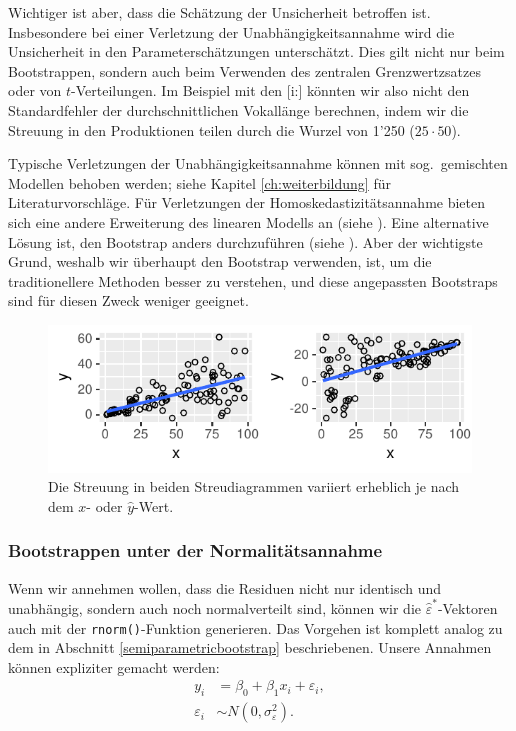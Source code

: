 \documentclass[oneside, 10pt]{book}\usepackage[]{graphicx}\usepackage[]{xcolor}
\newenvironment{knitrout}{}{} %
\begin{document}
 Wichtiger ist aber, dass die Schätzung der Unsicherheit betroffen ist.
 Insbesondere bei einer Verletzung der Unabhängigkeitsannahme wird die Unsicherheit
 in den Parameterschätzungen unterschätzt. Dies gilt nicht nur beim Bootstrappen,
 sondern auch beim Verwenden des zentralen Grenzwertzsatzes oder von $t$-Verteilungen.
 Im Beispiel mit den [i:] könnten wir also nicht den Standardfehler
 der durchschnittlichen Vokallänge berechnen, indem wir die Streuung in den
 Produktionen teilen durch die Wurzel von 1'250 ($25 \cdot 50$).

 Typische Verletzungen der Unabhängigkeitsannahme können
 mit sog.\ gemischten Modellen behoben werden; siehe
 Kapitel \ref{ch:weiterbildung} für Literaturvorschläge.
 Für Verletzungen der Homoskedastizitätsannahme bieten sich
 eine andere Erweiterung des linearen Modells an (siehe \citealp{Zuur2009}).
 Eine alternative Lösung ist, den Bootstrap anders durchzuführen
 (siehe \citealp[][Abschnitt 9.5]{Efron1993}).
 Aber der wichtigste Grund, weshalb wir überhaupt den Bootstrap verwenden,
 ist, um die traditionellere Methoden besser zu verstehen, und diese
 angepassten Bootstraps sind für diesen Zweck weniger geeignet.

\begin{knitrout}
\color{fgcolor}\begin{figure}[tp]

{\centering \includegraphics[width=.7\textwidth]{figs/unnamed-chunk-222-1} 

}

\caption{Die Streuung in beiden Streudiagrammen variiert erheblich je nach dem $x$- oder $\widehat{y}$-Wert.\label{fig:heteroskedasticity}}\label{fig:unnamed-chunk-222}
\end{figure}

\end{knitrout}

\subsubsection{Bootstrappen unter der Normalitätsannahme}
Wenn wir annehmen wollen, dass die Residuen nicht nur
identisch und unabhängig, sondern auch noch normalverteilt sind,
können wir die $\widehat{\varepsilon}^{*}$-Vektoren auch mit der \texttt{rnorm()}-Funktion
generieren. Das Vorgehen ist komplett analog zu dem
in Abschnitt \vref{semiparametricbootstrap} beschriebenen.
Unsere Annahmen können expliziter gemacht werden:
\begin{align}\label{eq:annahmeregression}
 y_i &= \beta_0 + \beta_1 x_i + \varepsilon_i,\\
 \varepsilon_i &\sim N(0, \sigma_{\varepsilon}^2).\nonumber
\end{align}
\end{document}
